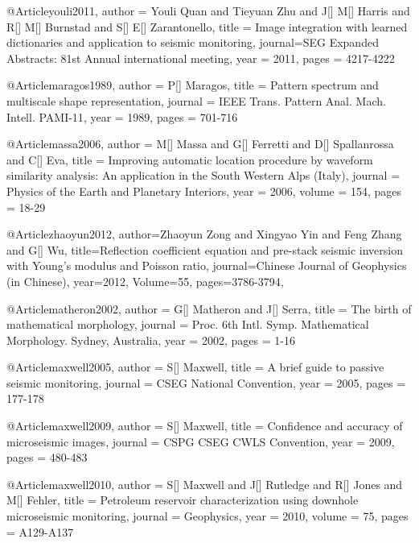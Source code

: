      @Article{youli2011,
  author = 	 {Youli Quan and Tieyuan Zhu and J[] M[] Harris and R[] M[] Burnstad and S[] E[] Zarantonello},
  title = 	 {Image integration with learned dictionaries and application to seismic monitoring},
  journal={SEG Expanded Abstracts: 81st Annual international meeting},
  year = 	 2011,
  pages = 	 {4217-4222}} 
    
     @Article{maragos1989,
  author = 	 {P[] Maragos},
  title = 	 {Pattern spectrum and multiscale shape representation},
  journal = 	 {IEEE Trans. Pattern Anal.
Mach. Intell. PAMI-11},
  year = 	 1989,
  pages = 	 {701-716}}     
  

     @Article{massa2006,
  author = 	 {M[] Massa and G[] Ferretti and D[] Spallanrossa and C[] Eva},
  title = 	 {Improving automatic location procedure by waveform similarity analysis: An application in the South Western Alps (Italy)},
  journal = 	 {Physics of the Earth and Planetary Interiors},
  year = 	 2006,
  volume = 	 154,
  pages = 	 {18-29}}  



@Article{zhaoyun2012,
  author={Zhaoyun Zong and Xingyao Yin and Feng Zhang and G[] Wu},
  title={Reflection coefficient equation and pre-stack seismic inversion with Young's modulus and Poisson ratio},
  journal={Chinese Journal of Geophysics (in Chinese)},
  year=2012,
  Volume=55,
  pages={3786-3794},
}


  
  
      @Article{matheron2002,
  author = 	 {G[] Matheron and J[] Serra},
  title = 	 {The birth of mathematical morphology},
  journal = 	 {Proc. 6th Intl. Symp.
Mathematical Morphology. Sydney, Australia},
  year = 	 2002,
  pages = 	 {1-16}}   

     @Article{maxwell2005,
  author = 	 {S[] Maxwell},
  title = 	 {A brief guide to passive seismic monitoring},
  journal = 	 {CSEG National Convention},
  year = 	 2005,
  pages = 	 {177-178}}   
  
     @Article{maxwell2009,
  author = 	 {S[] Maxwell},
  title = 	 {Confidence and accuracy of microseismic images},
  journal = 	 {CSPG CSEG CWLS Convention},
  year = 	 2009,
  pages = 	 {480-483}}   
  
    
     @Article{maxwell2010,
  author = 	 {S[] Maxwell and J[] Rutledge and R[] Jones and M[] Fehler},
  title = 	 {Petroleum reservoir characterization using downhole microseismic monitoring},
  journal = 	 {Geophysics},
  year = 	 2010,
  volume = 	 75,
  pages = 	 {A129-A137}}  


